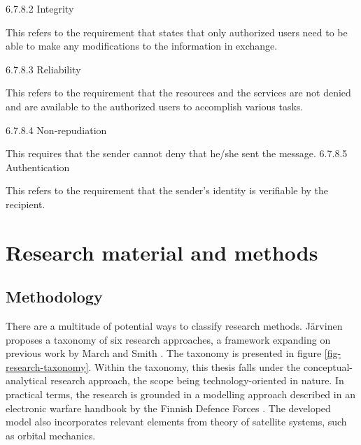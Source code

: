 \documentclass[english, 12pt, a4paper, elec, utf8, a-1b, online]{aaltothesis}
\begin{document}
6.7.8.2 Integrity

    This refers to the requirement that states that only authorized users need to be able to make any modifications to the information in exchange.

6.7.8.3 Reliability

    This refers to the requirement that the resources and the services are not denied and are available to the authorized users to accomplish various tasks.

6.7.8.4 Non‐repudiation

This requires that the sender cannot deny that he/she sent the message.
6.7.8.5 Authentication

    This refers to the requirement that the sender's identity is verifiable by the recipient.

\clearpage

\section{Research material and methods}


\subsection{Methodology}

There are a multitude of potential ways to classify research methods. Järvinen \cite{jarvinen2011tutkimustyon, jarvinen2004research} proposes a taxonomy of six research approaches, a framework expanding on previous work by March and Smith \cite{march}.
The taxonomy is presented in figure \ref{fig-research-taxonomy}.
Within the taxonomy, this thesis falls under the conceptual-analytical research approach, the scope being technology-oriented in nature.
In practical terms, the research is grounded in a modelling approach described in an electronic warfare handbook by the Finnish Defence Forces \cite{kosola2004elektroninen}.
The developed model also incorporates relevant elements from theory of satellite systems, such as orbital mechanics.
\end{document}

